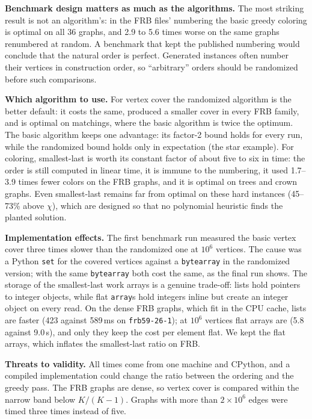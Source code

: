 \documentclass[acmsmall,nonacm]{acmart}
\newcommand{\code}[1]{\texttt{#1}}
\begin{document}
\textbf{Benchmark design matters as much as the algorithms.} The most
striking result is not an algorithm's: in the FRB files' numbering the basic
greedy coloring is optimal on all 36 graphs, and 2.9 to 5.6 times worse on the
same graphs renumbered at random. A benchmark that kept the published numbering
would conclude that the natural order is perfect. Generated instances often
number their vertices in construction order, so ``arbitrary'' orders should be
randomized before such comparisons.

\textbf{Which algorithm to use.} For vertex cover the randomized algorithm is
the better default: it costs the same, produced a smaller cover in every FRB
family, and is optimal on matchings, where the basic algorithm is twice the
optimum. The basic algorithm keeps one advantage: its factor-2 bound holds for
every run, while the randomized bound holds only in expectation (the star
example). For coloring, smallest-last is worth its constant factor of about
five to six in time: the order is still computed in linear time, it is immune to the
numbering, it used 1.7--3.9 times fewer colors on the FRB graphs, and it is
optimal on trees and crown graphs. Even smallest-last remains far from optimal
on these hard instances (45--73\% above $\chi$), which are designed so that no
polynomial heuristic finds the planted solution.

\textbf{Implementation effects.} The first benchmark run measured the basic
vertex cover three times slower than the randomized one at $10^6$ vertices.
The cause was a Python \code{set} for the covered vertices against a
\code{bytearray} in the randomized version; with the same \code{bytearray}
both cost the same, as the final run shows. The storage of the smallest-last
work arrays is a genuine trade-off: lists hold pointers to integer objects,
while flat \code{array}s hold integers inline but create an integer object on
every read. On the dense FRB graphs, which fit in the CPU cache, lists are
faster (423 against 589\,ms on \code{frb59-26-1}); at $10^6$ vertices flat
arrays are (5.8 against 9.0\,s), and only they keep the cost per element flat.
We kept the flat arrays, which inflates the smallest-last ratio on FRB.

\textbf{Threats to validity.} All times come from one machine and CPython, and
a compiled implementation could change the ratio between the ordering and the
greedy pass. The FRB graphs are dense, so vertex cover is compared within the
narrow band below $K/(K-1)$. Graphs with more than $2\times10^6$ edges were
timed three times instead of five.
\end{document}
